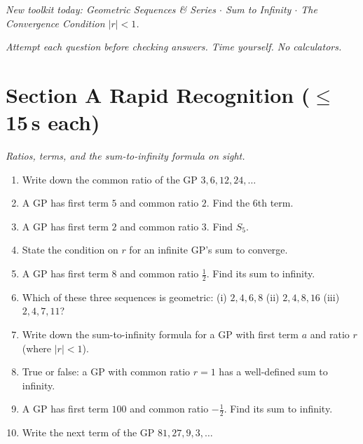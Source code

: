 \documentclass[11pt,a4paper]{article}
\begin{document}
\noindent\textit{New toolkit today: Geometric Sequences \& Series $\cdot$ Sum to Infinity $\cdot$ The Convergence Condition $|r|<1$.}

\vspace{2pt}
\noindent\textit{Attempt each question before checking answers. Time yourself. No calculators.}

\section*{Section A \quad Rapid Recognition \hfill{\normalfont\small($\leq$15\,s each)}}

\noindent\textit{Ratios, terms, and the sum-to-infinity formula on sight.}

\begin{enumerate}

\item Write down the common ratio of the GP $3,6,12,24,\ldots$

\item A GP has first term $5$ and common ratio $2$. Find the 6th term.

\item A GP has first term $2$ and common ratio $3$. Find $S_5$.

\item State the condition on $r$ for an infinite GP's sum to converge.

\item A GP has first term $8$ and common ratio $\tfrac12$. Find its sum to infinity.

\item Which of these three sequences is geometric: (i) $2,4,6,8$ \quad (ii) $2,4,8,16$ \quad (iii) $2,4,7,11$?

\item Write down the sum-to-infinity formula for a GP with first term $a$ and ratio $r$ (where $|r|<1$).

\item True or false: a GP with common ratio $r=1$ has a well-defined sum to infinity.

\item A GP has first term $100$ and common ratio $-\tfrac12$. Find its sum to infinity.

\item Write the next term of the GP $81, 27, 9, 3, \ldots$

\end{enumerate}
\end{document}
